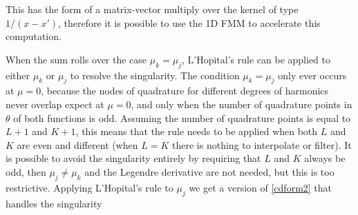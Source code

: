 This has the form of a matrix-vector multiply over the kernel of type $1/(x-x')$, therefore it is possible to use the 1D FMM to accelerate this computation. 

When the sum rolls over the case $\mu_k = \mu_j$, L'Hopital's rule can be applied to either $\mu_k$ or $\mu_j$ to resolve the singularity. The condition $\mu_k = \mu_j$ only ever occurs at $\mu = 0$, because the nodes of quadrature for different degrees of harmonics never overlap expect at $\mu = 0$, and only when the number of quadrature points in $\theta$ of both functions is odd. Assuming the number of quadrature points is equal to $L+1$ and $K+1$, this means that the rule needs to be applied when both $L$ and $K$ are even and different (when $L=K$ there is nothing to interpolate or filter). It is possible to avoid the singularity entirely by requiring that $L$ and $K$ always be odd, then $\mu_j \ne \mu_k$ and the Legendre derivative are not needed, but this is too restrictive.  Applying L'Hopital's rule to $\mu_j$ we get a version of \eqref{cdform2} that handles the singularity


%


